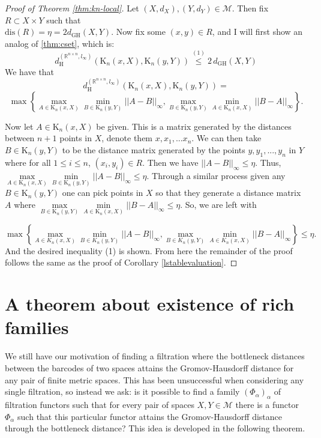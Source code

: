 \documentclass[a4paper,12pt,reqno, english]{amsart}
\newcommand{\dgh}{d_{\mathrm{GH}}}
\newcommand{\dH}{d_{\mathrm{H}}}
\newcommand{\cset}{\mathrm{K}}
\newcommand{\dis}{\mathrm{dis}}
\newcommand{\R}{\mathbb{R}}
\newcommand{\M}{\mathcal{M}}
\newcommand{\F}{\mathcal{F}}
\theoremstyle{plain}
\theoremstyle{definition}
\begin{document}
\begin{proof}[Proof of Theorem \ref{thm:kn-local}]
Let $(X,d_X),(Y,d_Y)\in \M$. Then fix $R \subset X\times Y$ such that\\ $\dis(R) = \eta = 2\dgh(X,Y)$. Now fix some $(x,y) \in R$, and I will first show an analog of \ref{thm:cset}, which is:
$$\dH^{(\R^{n\times n},l_\infty)}(\cset_n(x,X),\cset_n(y,Y))\stackrel{(1)}\leq 2 \, \dgh(X,Y)$$
We have that $$\dH^{(\R^{n\times n},l_\infty)}(\cset_n(x,X),\cset_n(y,Y)) = $$
$$\max\left\{\max\limits_{A\in \cset_n(x,X)}\min\limits_{B\in \cset_n(y,Y)}||A-B||_\infty, \max\limits_{B\in \cset_n(y,Y)}\min\limits_{A\in \cset_n(x,X)}||B-A||_\infty\right\}.$$

Now let $A\in \cset_n(x,X)$ be given. This is a matrix generated by the distances between $n+1$ points in $X$, denote them $x,x_1,...x_n$. We can then take $B\in \cset_n(y,Y)$ to be the distance matrix generated by the points $y,y_1,...,y_n$  in $Y$ where for all $1\leq i \leq n$, $(x_i,y_i)\in R$. Then we have $||A-B||_\infty \leq \eta$. Thus, 
$\max\limits_{A\in \cset_n(x,X)}\min\limits_{B\in \cset_n(y,Y)}||A-B||_\infty \leq \eta.$
Through a similar process given any $B\in \cset_n(y,Y)$ one can pick points in $X$ so that they generate a distance matrix $A$ where 
$\max\limits_{B\in \cset_n(y,Y)}\min\limits_{A\in \cset_n(x,X)}||B-A||_\infty \leq \eta.$ 
So, we are left with 

$$\max\left\{\max\limits_{A\in K_n(x,X)}\min\limits_{B\in K_n(y,Y)}||A-B||_\infty, \max\limits_{B\in K_n(y,Y)}\min\limits_{A\in K_n(x,X)}||B-A||_\infty\right\} \leq \eta.$$
And the desired inequality (1) is shown.
From here the remainder of the proof follows the same as the proof of Corollary \ref{lstablevaluation}.

\end{proof}


\section{A theorem about existence of rich families}



We still have our motivation of finding a filtration where the bottleneck distances between the barcodes of two spaces attains the Gromov-Hausdorff distance for any pair of finite metric spaces. This has been unsuccessful when considering any single filtration, so instead we ask: is it possible to find a family $(\Phi_\alpha)_{\alpha}$ of filtration functors such that for every pair of spaces $X,Y\in \M$ there is a functor $\Phi_\alpha$ such that this particular functor attains the Gromov-Hausdorff distance through the bottleneck distance? This idea is developed in the following theorem.
\end{document}
